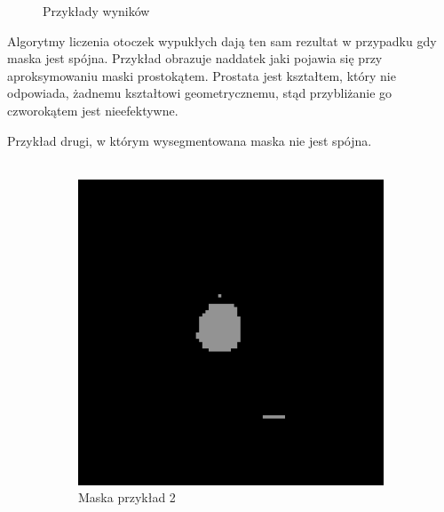 \documentclass[a4paper,11pt,twoside]{report}
\theoremstyle{definition}
\begin{document}
\begin{figure}[htb]
	\caption{Przykłady wyników}
	\label{fig:images}
\end{figure}


Algorytmy liczenia otoczek wypukłych dają ten sam rezultat w przypadku gdy maska jest spójna. Przykład obrazuje naddatek jaki pojawia się przy aproksymowaniu maski prostokątem. Prostata jest kształtem, który nie odpowiada, żadnemu kształtowi geometrycznemu, stąd przybliżanie go czworokątem jest nieefektywne.

Przykład drugi, w którym wysegmentowana maska nie jest spójna. \\ \\

\begin{figure}[htb]
	\centering %
	\begin{subfigure}{0.25\textwidth}
		\includegraphics[width=\linewidth]{Mask/2/mask.png}
		\caption{Maska przykład 2}
		\label{fig:1}
	\end{subfigure}\hfil %
	\begin{subfigure}{0.25\textwidth}

\end{subfigure}
\end{figure}
\end{document}
